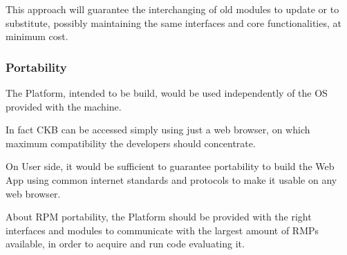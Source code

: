 This approach will guarantee the interchanging of old modules to update or to substitute, possibly maintaining the same interfaces and core functionalities, at minimum cost.

\subsubsection{Portability}
The Platform, intended to be build, would be used independently of the OS provided with the machine. 

In fact CKB can be accessed simply using just a web browser, on which maximum compatibility the developers should concentrate. 

On User side, it would be sufficient to guarantee portability to build the Web App using common internet standards and protocols to make it usable on any web browser.

About RPM portability, the Platform should be provided with the right interfaces and modules to communicate with the largest amount of RMPs available, in order to acquire and run code evaluating it.